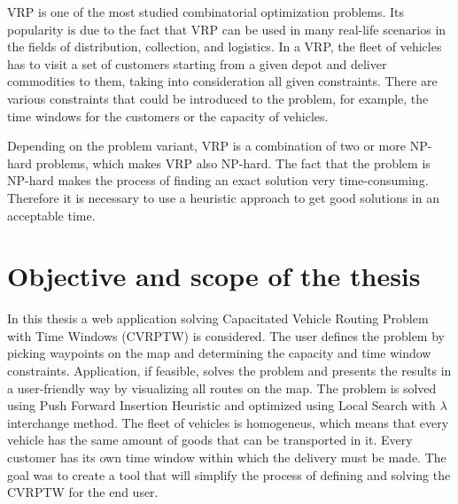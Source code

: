 \documentclass[a4paper,twoside,12pt]{book}
\begin{document}
VRP is one of the most studied combinatorial optimization problems. Its popularity is due to the fact that VRP can be used in many real-life scenarios in the fields of distribution, collection, and logistics.
In a VRP, the fleet of vehicles has to visit a set of customers starting from a given depot and deliver commodities to them, taking into consideration all given constraints. There are various constraints that could be introduced to the problem, for example, the time windows for the customers or the capacity of vehicles.

Depending on the problem variant, VRP is a combination of two or more NP-hard problems, which makes VRP also NP-hard. The fact that the problem is NP-hard makes the process of finding an exact solution very time-consuming. Therefore it is necessary to use a heuristic approach to get good solutions in an acceptable time.
\section{Objective and scope of the thesis}
In this thesis a web application solving Capacitated Vehicle Routing Problem with Time Windows (CVRPTW) is considered. The user defines the problem by picking waypoints on the map and determining the capacity and time window constraints. Application, if feasible, solves the problem and presents the results in a user-friendly way by visualizing all routes on the map.
The problem is solved using Push Forward Insertion Heuristic and optimized using Local Search with {$\lambda$} interchange method. 
The fleet of vehicles is homogeneus, which means that every vehicle has the same amount of goods that can be transported in it. Every customer has its own time window within which the delivery must be made.
The goal was to create a tool that will simplify the process of defining and solving the CVRPTW for the end user.
\end{document}

